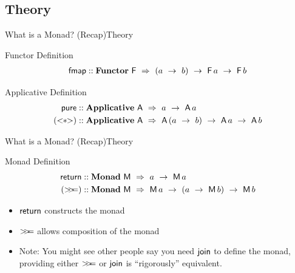 \documentclass{beamer}
\begin{document}
  \subsection{Theory}
  \begin{frame}{What is a Monad? (Recap)}{Theory}
    \begin{block}{Functor Definition}
      \begin{align*}
        \fmap &:: \mathbf{Functor}\ \mathsf{F}\ \Rightarrow\ (a\ \rightarrow\ b)\ \rightarrow\ \F{a}\ \rightarrow\ \F{b}\\
      \end{align*}
    \end{block}
    \begin{block}{Applicative Definition}
      \begin{align*}
        \pure &:: \mathbf{Applicative}\ \mathsf{A}\ \Rightarrow\ a\ \rightarrow\ \A{a}\\
        (\app) &:: \mathbf{Applicative}\ \mathsf{A}\ \Rightarrow\ \A{(a\ \rightarrow\ b)}\ \rightarrow\ \A{a}\ \rightarrow\ \A{b}\\
      \end{align*}
    \end{block}
  \end{frame}
  \begin{frame}{What is a Monad? (Recap)}{Theory}
    \begin{block}{Monad Definition}
      \begin{align*}
        \return &:: \mathbf{Monad}\ \mathsf{M}\ \Rightarrow\ a\ \rightarrow\ \M{a}\\
        (\bind) &:: \mathbf{Monad}\ \mathsf{M}\ \Rightarrow\ \M{a}\ \rightarrow\ (a\ \rightarrow\ \M{b})\ \rightarrow\ \M{b}\\
      \end{align*}
    \end{block}
    \begin{itemize}
      \item $\mathsf{return}$ constructs the monad\\
      \item $\mathsf{>\!\!>\!\!=}$ allows composition of the monad\\
      \item Note: You might see other people say you need $\mathsf{join}$ to define the monad,
        providing either $\mathsf{>\!\!>\!\!=}$ or $\mathsf{join}$ is ``rigorously'' equivalent.
    \end{itemize}
  \end{frame}

\end{document}
